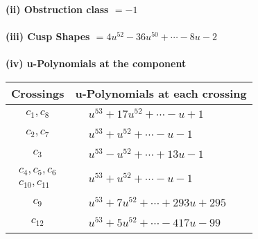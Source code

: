 \documentclass[1p]{elsarticle_modified}
\theoremstyle{definition}
\begin{document}
\flushleft \textbf{(ii) Obstruction class $= -1$}\\~\\
\flushleft \textbf{(iii) Cusp Shapes $= 4 u^{52}-36 u^{50}+\cdots-8 u-2$}\\~\\
\newpage\renewcommand{\arraystretch}{1}
\flushleft \textbf{(iv) u-Polynomials at the component}\newline \\
\begin{tabular}{m{50pt}|m{274pt}}
Crossings & \hspace{64pt}u-Polynomials at each crossing \\
\hline $$\begin{aligned}c_{1},c_{8}\end{aligned}$$&$\begin{aligned}
&u^{53}+17 u^{52}+\cdots- u+1
\end{aligned}$\\
\hline $$\begin{aligned}c_{2},c_{7}\end{aligned}$$&$\begin{aligned}
&u^{53}+u^{52}+\cdots- u-1
\end{aligned}$\\
\hline $$\begin{aligned}c_{3}\end{aligned}$$&$\begin{aligned}
&u^{53}- u^{52}+\cdots+13 u-1
\end{aligned}$\\
\hline $$\begin{aligned}c_{4},c_{5},c_{6}\\c_{10},c_{11}\end{aligned}$$&$\begin{aligned}
&u^{53}+u^{52}+\cdots- u-1
\end{aligned}$\\
\hline $$\begin{aligned}c_{9}\end{aligned}$$&$\begin{aligned}
&u^{53}+7 u^{52}+\cdots+293 u+295
\end{aligned}$\\
\hline $$\begin{aligned}c_{12}\end{aligned}$$&$\begin{aligned}
&u^{53}+5 u^{52}+\cdots-417 u-99
\end{aligned}$\\
\hline
\end{tabular}\\~\\
\end{document}
